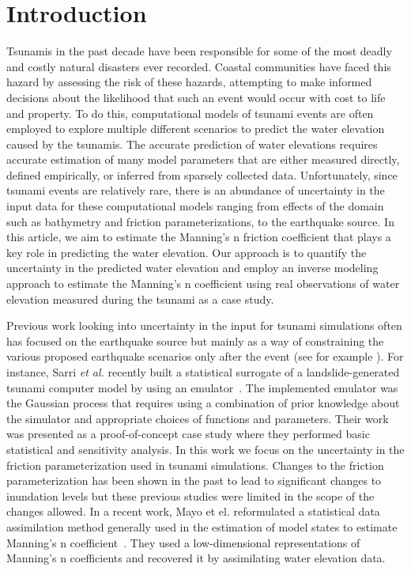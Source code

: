 
\section{Introduction}

Tsunamis in the past decade have been responsible for some of the most 
deadly and costly natural disasters ever recorded. Coastal communities 
have faced this hazard by assessing the risk of these hazards, attempting 
to make informed decisions about the likelihood that such an event would 
occur with cost to life and property.  To do this, computational models of 
tsunami events are often employed to explore multiple different scenarios
to predict the water elevation caused by the tsunamis. The accurate prediction 
of water elevations requires accurate estimation of many model parameters that 
are either measured directly, defined empirically, or inferred from
sparsely collected data. Unfortunately, since tsunami events are relatively rare, 
there is an abundance of uncertainty in the input data for these computational 
models ranging from effects of the domain such as bathymetry and friction parameterizations, 
to the earthquake source.  In this article, we aim to estimate the Manning's n friction
coefficient that plays a key role in predicting the water elevation. 
Our approach is to quantify the uncertainty in the predicted water elevation 
and employ an inverse modeling approach to estimate the Manning's n coefficient 
using real observations of water elevation measured during the \tohoku tsunami as a case study.

Previous work looking into uncertainty in the input for tsunami simulations often has focused on the earthquake source but mainly as a way of constraining the various proposed earthquake scenarios only after the event (see for example \cite{MacInnes:2013cr}).  For instance, Sarri \emph{et al.} recently built a statistical surrogate of a landslide-generated tsunami computer model by using an emulator~\cite{Sarri2012}. The implemented emulator was the Gaussian process that requires using a combination of prior knowledge about the simulator and
appropriate choices of functions and parameters. Their work was presented as a proof-of-concept case study
where they performed basic statistical and sensitivity analysis. In this work we focus on the uncertainty in the friction parameterization used in tsunami simulations.  Changes to the friction parameterization has been shown in the past to lead to significant changes to inundation levels \cite{Myers:2001el,Jakeman:2010hk} but these previous studies were limited in the scope of the changes allowed.  In a recent work, Mayo et el. reformulated a statistical data assimilation method generally used in the estimation of model states to estimate Manning's n coefficient~\cite{Mayo2013}. They used a low-dimensional representations of Manning's n coefficients and recovered it by assimilating water elevation data.

